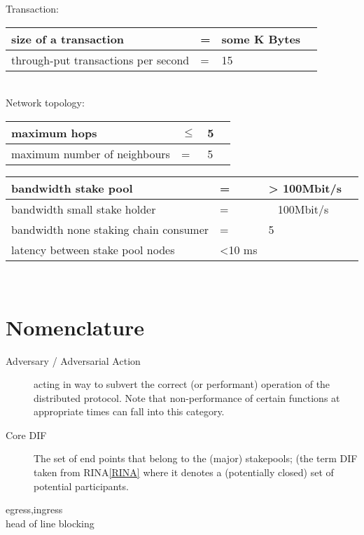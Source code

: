 \documentclass{report}
\theoremstyle{definition}{
  \newtheorem{lemma}{Lemma}[section] %
  \newtheorem{definition}[lemma]{Definition}
}
\theoremstyle{theorem}{
  \newtheorem{invariant}[lemma]{Invariant}
  \newtheorem{proofobligation}[lemma]{Proof Obligation}
}
\numberwithin{equation}{lemma}
\begin{document}
Transaction:\\
\begin{tabular}{p{4cm}p{1cm}p{6cm}p{1cm}} \hline
  size of a transaction                & = &  some K Bytes               &  \\ \hline
  through-put transactions per second   & = &  15                        &  \\ \hline
\end{tabular}\\

Network topology:\\
\begin{tabular}{p{4cm}p{1cm}p{6cm}p{1cm}} \hline
  maximum hops                         & $\le$ &  5                         &  \\ \hline
  maximum number of neighbours          & = &  5                         &  \\ \hline
\end{tabular}

\begin{tabular}{p{4cm}p{1cm}p{6cm}p{1cm}} \hline
  bandwidth stake pool                             & = &  > 100Mbit/s             &  \\ \hline
  bandwidth small stake holder                    & = &  ~ 100Mbit/s             &  \\ \hline
  bandwidth none staking chain consumer          & = &  5                       &  \\ \hline
  latency  between stake pool nodes                & <10 ms                       &  \\ \hline
\end{tabular}\\


\section{Nomenclature}
\begin{description}
\item[Adversary / Adversarial Action]
  acting in way to subvert the correct (or performant) operation of the distributed protocol.
  Note that non-performance of certain functions at appropriate times can
  fall into this category.
\item[Core DIF]
  The set of end points that belong to the (major)
  stakepools; (the term DIF taken from RINA\ref{RINA} where it denotes
  a (potentially closed) set of potential participants.
\item[egress,ingress]
\item[head of line blocking]
\end{description}
\end{document}
